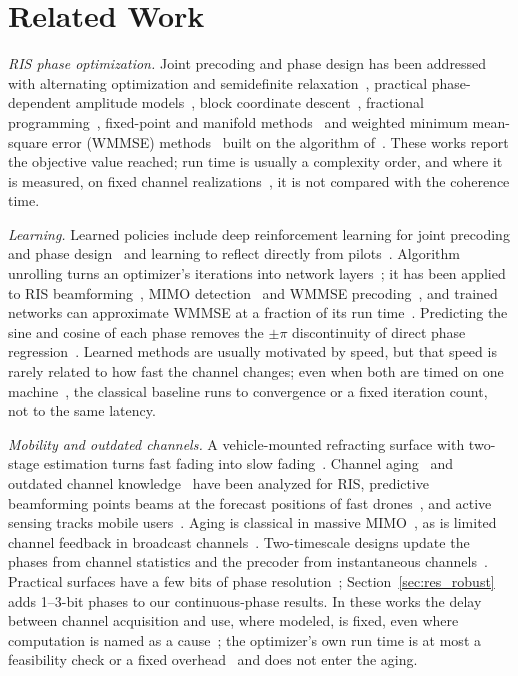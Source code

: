 \section{Related Work}
\label{sec:related_work}

\emph{RIS phase optimization.} Joint precoding and phase design has been addressed with alternating optimization and semidefinite relaxation~\cite{Wu2019TWC}, practical phase-dependent amplitude models~\cite{Abeywickrama2020TCOM}, block coordinate descent~\cite{Pan2020TWC}, fractional programming~\cite{Guo2020TWC}, fixed-point and manifold methods~\cite{Yu2019ICCC} and weighted minimum mean-square error (WMMSE) methods~\cite{Choi2024TCOM} built on the algorithm of~\cite{Shi2011TSP}. These works report the objective value reached; run time is usually a complexity order, and where it is measured, on fixed channel realizations~\cite{Abeywickrama2020TCOM,Yu2019ICCC,Shi2011TSP,Cao2022TWC}, it is not compared with the coherence time.

\emph{Learning.} Learned policies include deep reinforcement learning for joint precoding and phase design~\cite{Huang2020JSAC} and learning to reflect directly from pilots~\cite{Jiang2021JSAC}. Algorithm unrolling turns an optimizer's iterations into network layers~\cite{Monga2021SPM}; it has been applied to RIS beamforming~\cite{Liu2022TWC}, MIMO detection~\cite{Samuel2019TSP} and WMMSE precoding~\cite{Hu2021TWC,Pellaco2022OJCOMS}, and trained networks can approximate WMMSE at a fraction of its run time~\cite{Sun2018TSP}. Predicting the sine and cosine of each phase removes the $\pm\pi$ discontinuity of direct phase regression~\cite{SavasciSen2026AISY}. Learned methods are usually motivated by speed, but that speed is rarely related to how fast the channel changes; even when both are timed on one machine~\cite{Samuel2019TSP,Sun2018TSP,Hu2021TWC,Liu2022TWC}, the classical baseline runs to convergence or a fixed iteration count, not to the same latency.

\emph{Mobility and outdated channels.} A vehicle-mounted refracting surface with two-stage estimation turns fast fading into slow fading~\cite{Huang2022TWC}. Channel aging~\cite{Papazafeiropoulos2023TVT} and outdated channel knowledge~\cite{Zhang2022TCOM} have been analyzed for RIS, predictive beamforming points beams at the forecast positions of fast drones~\cite{Liu2021WCL}, and active sensing tracks mobile users~\cite{Han2025TWC}. Aging is classical in massive MIMO~\cite{Truong2013JCN,Chopra2018TWC}, as is limited channel feedback in broadcast channels~\cite{Jindal2006IT}. Two-timescale designs update the phases from channel statistics and the precoder from instantaneous channels~\cite{Zhao2021TWC,Cao2022TWC}. Practical surfaces have a few bits of phase resolution~\cite{Wu2020TCOM,Zhao2024OJCOMS}; Section~\ref{sec:res_robust} adds 1--3-bit phases to our continuous-phase results. In these works the delay between channel acquisition and use, where modeled, is fixed, even where computation is named as a cause~\cite{Truong2013JCN}; the optimizer's own run time is at most a feasibility check or a fixed overhead~\cite{Ryu2026arXiv,Liu2021WCL} and does not enter the aging.

